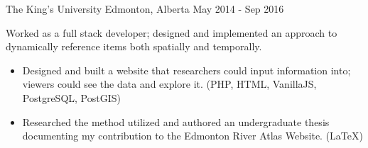 \begin{cventries}
        {The King's University}
        {Edmonton, Alberta}
        {May 2014 - Sep 2016}
        {
            Worked as a full stack developer; designed and implemented an approach to dynamically reference items both spatially and temporally.
            \begin{itemize}
                \item Designed and built a website that researchers could input information into; viewers could see the data and explore it. (PHP, HTML, VanillaJS, PostgreSQL, PostGIS)
                \item Researched the method utilized and authored an undergraduate thesis documenting my contribution to the Edmonton River Atlas
                Website. (\LaTeX)
            \end{itemize}
        }

\end{cventries}
